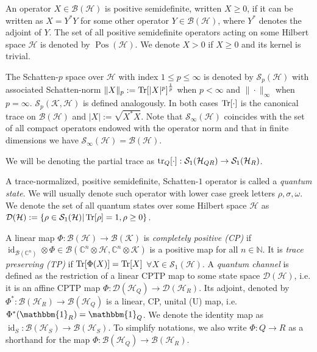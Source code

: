 \documentclass[11pt]{article}
\DeclareMathOperator{\Pos}{Pos}
\DeclareMathOperator{\id}{id}
\newcommand{\1}{\ensuremath{\mathbbm{1}}}
\theoremstyle{newdefinition}
\theoremstyle{newplain}
\theoremstyle{myplain}
\begin{document}
An operator $X\in \mathcal{B}(\mathcal{H})$ is positive semidefinite, written $X\geq0$, if it can be written as $X=Y^*Y$ for some other operator $Y\in\mathcal{B}(\mathcal{H})$, where $Y^*$ denotes the adjoint of $Y$. The set of all positive semidefinite operators acting on some Hilbert space $\mathcal{H}$ is denoted by $\Pos(\mathcal{H})$. We denote $X>0$ if $X\geq 0$ and its kernel is trivial.

The Schatten-$p$ space over $\mathcal{H}$ with index $1\leq p\leq\infty$ is denoted by $\mathcal{S}_p(\mathcal{H})$ with associated Schatten-norm $\|X\|_p:=\Tr[|X|^p]^{\frac{1}{p}}$ when $p<\infty$ and $\|\cdot\|_\infty$ when $p=\infty$. $\mathcal{S}_p(\mathcal{K},\mathcal{H})$ is defined analogously. In both cases $\Tr[\cdot]$ is the canonical trace on $\mathcal{B}(\mathcal{H})$ and $|X|:=\sqrt{X^*X}.$ 
Note that $\mathcal{S}_\infty(\mathcal{H})$ coincides with the set of all compact operators endowed with the operator norm and that in finite dimensions we have $\mathcal{S}_\infty(\mathcal{H})=\mathcal{B}(\mathcal{H})$.

We will be denoting the partial trace as $\tr_Q[\cdot]:\mathcal{S}_1(\mathcal{H}_{QR})\to \mathcal{S}_1(\mathcal{H}_{R})$.

A trace-normalized, positive semidefinite, Schatten-$1$ operator is called a \textit{quantum state}. We will usually denote such operator with lower case greek letters $\rho,\sigma,\omega$. We denote the set of all quantum states over some Hilbert space $\mathcal{H}$ as $\mathcal{D}(\mathcal{H}):=\{\rho\in \mathcal{S}_1(\mathcal{H}
)|\Tr[\rho]=1, \rho\geq0\}$.
 
A linear map $\Phi:\mathcal{B}(\mathcal{H})\to \mathcal{B}(\mathcal{K})$ is \textit{completely positive (CP)} if $\id_{\mathcal{B}(\mathbb{C}^n)}\otimes\Phi\in\mathcal{B}(\mathbb{C}^n\otimes\mathcal{H},\mathbb{C}^n\otimes\mathcal{K})$ is a positive map for all $n\in\mathbb{N}$. It is \textit{trace preserving (TP)} if $\Tr[\Phi(X)]=\Tr[X]$ $\forall X\in \mathcal{S}_1(\mathcal{H})$.
A \textit{quantum channel} is defined as the restriction of a linear CPTP map to some state space $\mathcal{D}(\mathcal{H})$, i.e. it is an affine CPTP map $\Phi:\mathcal{D}(\mathcal{H}_Q)\to \mathcal{D}(\mathcal{H}_R)$. Its adjoint, denoted by $\Phi^*:\mathcal{B}(\mathcal{H}_R)\to \mathcal{B}(\mathcal{H}_Q)$ is a linear, CP, unital (U) map, i.e. $\Phi^*(\1_R)=\1_Q$.
We denote the identity map as $\id_S:\mathcal{B}(\mathcal{H}_S)\to \mathcal{B}(\mathcal{H}_S)$. To simplify notations, we also write $\Phi:Q\to R$ as a shorthand for the map $\Phi:\mathcal{B}(\mathcal{H}_Q)\to \mathcal{B}(\mathcal{H}_R)$.
\end{document}
